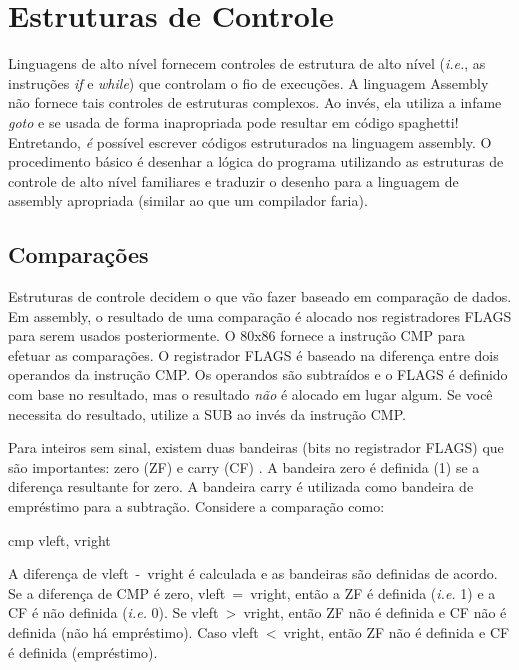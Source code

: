 \section{Estruturas de Controle}
\label{sec:control}
Linguagens de alto nível fornecem controles de estrutura de alto nível (\emph{i.e.}, as
instruções \emph{if} e \emph{while}) que controlam o fio de execuções.
A linguagem Assembly não fornece tais controles de estruturas complexos. Ao invés, ela
utiliza a infame \emph{goto} e se usada de forma inapropriada pode resultar em
código spaghetti! Entretando, \emph{é} possível escrever códigos estruturados
na linguagem assembly. O procedimento básico é desenhar a lógica do programa utilizando
as estruturas de controle de alto nível familiares e traduzir o desenho para
a linguagem de assembly apropriada (similar ao que um compilador faria).

\subsection{Comparações  }

Estruturas de controle decidem o que vão fazer baseado em comparação de dados. Em
assembly, o resultado de uma comparação é alocado nos registradores FLAGS 
para serem usados posteriormente. O 80x86 fornece a instrução {\code CMP} para
efetuar as comparações. O registrador FLAGS é baseado na
diferença entre dois operandos da instrução {\code CMP}. Os
operandos são subtraídos e o FLAGS é definido com base no resultado, mas
o resultado \emph{não} é alocado em lugar algum. Se você necessita do resultado, utilize
a SUB ao invés da instrução {\code CMP}.

Para inteiros sem sinal, existem duas bandeiras (bits no registrador 
FLAGS) que são importantes: zero (ZF)  e carry (CF) 
. A bandeira
zero é definida (1) se a diferença resultante for zero. A bandeira
carry é utilizada como bandeira de empréstimo para a subtração. Considere a
comparação como:
\begin{AsmCodeListing}[frame=none, numbers=none]
      cmp    vleft, vright
\end{AsmCodeListing}
A diferença de {\code vleft~-~vright} é calculada e as bandeiras são
definidas de acordo. Se a diferença de {\code CMP} é zero, {\code 
vleft~=~vright}, então a ZF é definida (\emph{i.e.} 1) e a CF é não definida
(\emph{i.e.} 0). Se {\code vleft~>~vright}, então ZF não é definida e CF
não é definida (não há empréstimo). Caso {\code vleft~<~vright}, então ZF não é definida e
CF é definida (empréstimo).

